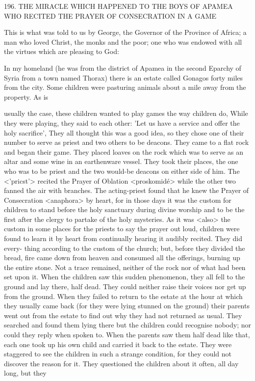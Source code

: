 196. THE MIRACLE WHICH HAPPENED
TO THE BOYS OF APAMEA
WHO RECITED THE PRAYER OF CONSECRATION
IN A GAME

This is what was told to us by George, the Governor of the
Province of Africa; a man who loved Christ, the monks and the
poor; one who was endowed with all the virtues which are pleasing
to God:

In my homeland (he was from the district of Apamea in the second
Eparchy of Syria from a town named Thorax) there is an estate
called Gonagos forty miles from the city. Some children were
pasturing animals about a mile away from the property. As is

usually the case, these children wanted to play games the way
children do, While they were playing, they said to each other: 'Let
us have a service and offer the holy sacrifice', They all thought this
was a good idea, so they chose one of their number to serve as
priest and two others to be deacons. They came to a flat rock and
began their game. They placed loaves on the rock which was to
serve as an altar and some wine in an earthenware vessel. They took
their places, the one who was to be priest and the two would-be
deacons on either side of him. The <'pricst'> recited the Prayer of
Oblation <proskomidé> while the other two fanned the air with
branches. The acting-priest found that he knew the Prayer of
Consecration <anaphora> by heart, for in those days it was the
custom for children to stand before the holy sanctuary during divine
worship and to be the first after the clergy to partake of the holy
mysteries. As it was <also> the custom in some places for the
priests to say the prayer out loud, children were found to learn it by
heart from continually hearing it audibly recited. They did every-
thing according to the custom of the church; but, before they
divided the bread, fire came down from heaven and consumed all
the offerings, burning up the entire stone. Not a trace remained,
neither of the rock nor of what had been set upon it. When the
children saw this sudden phenomenon, they all fell to the ground
and lay there, half dead. They could neither raise their voices nor
get up from the ground. When they failed to return to the estate at
the hour at which they usually came back (for they were lying
stunned on the ground) their parents went out from the estate to
find out why they had not returned as usual. They searched and
found them lying there but the children could recognise nobody; nor
could they reply when spoken to. When the parents saw them half
dead like that, each one took up his own child and carried it back
to the estate. They were staggered to see the children in such a
strange condition, for they could not discover the reason for it.
They questioned the children about it often, all day long, but they

